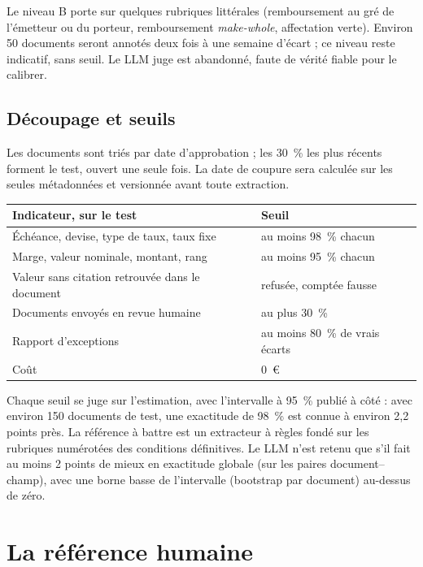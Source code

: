 \documentclass[11pt,a4paper]{article}
\begin{document}
Le niveau B porte sur quelques rubriques littérales (remboursement au gré de l'émetteur ou du porteur, remboursement \emph{make-whole}, affectation verte). Environ 50 documents seront annotés deux fois à une semaine d'écart ; ce niveau reste indicatif, sans seuil. Le LLM juge est abandonné, faute de vérité fiable pour le calibrer.

\subsection{Découpage et seuils}

Les documents sont triés par date d'approbation ; les 30~\% les plus récents forment le test, ouvert une seule fois. La date de coupure sera calculée sur les seules métadonnées et versionnée avant toute extraction.

\begin{table}[H]
\small
\begin{tabularx}{\linewidth}{Yl}
\toprule
\textbf{Indicateur, sur le test} & \textbf{Seuil} \\
\midrule
Échéance, devise, type de taux, taux fixe & au moins 98~\% chacun \\
Marge, valeur nominale, montant, rang & au moins 95~\% chacun \\
Valeur sans citation retrouvée dans le document & refusée, comptée fausse \\
Documents envoyés en revue humaine & au plus 30~\% \\
Rapport d'exceptions & au moins 80~\% de vrais écarts \\
Coût & 0~€ \\
\bottomrule
\end{tabularx}
\end{table}

Chaque seuil se juge sur l'estimation, avec l'intervalle à 95~\% publié à côté : avec environ 150 documents de test, une exactitude de 98~\% est connue à environ 2,2 points près. La référence à battre est un extracteur à règles fondé sur les rubriques numérotées des conditions définitives. Le LLM n'est retenu que s'il fait au moins 2 points de mieux en exactitude globale (sur les paires document--champ), avec une borne basse de l'intervalle (bootstrap par document) au-dessus de zéro.

\section{La référence humaine}
\end{document}

